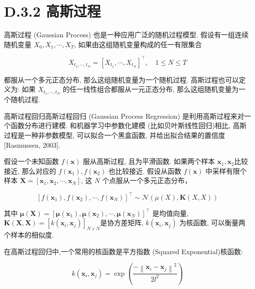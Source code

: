 \documentclass[10pt]{article}
\begin{document}
\section*{D.3.2 高斯过程}
高斯过程 (Gaussian Process) 也是一种应用广泛的随机过程模型. 假设有一组连续随机变量 $X_{0}, X_{1}, \cdots, X_{T}$, 如果由这组随机变量构成的任一有限集合

$$
X_{t_{1}, \cdots, t_{N}}=\left[X_{t_{1}}, \cdots, X_{t_{N}}\right]^{\top}, \quad 1 \leq N \leq T
$$

都服从一个多元正态分布, 那么这组随机变量为一个随机过程. 高斯过程也可以定义为: 如果 $X_{t_{1}, \cdots, t_{N}}$ 的任一线性组合都服从一元正态分布, 那么这组随机变量为一个随机过程.

高斯过程回归高斯过程回归 (Gaussian Process Regression) 是利用高斯过程来对一个函数分布进行建模. 和机器学习中参数化建模 (比如贝叶斯线性回归)相比, 高斯过程是一种非参数模型, 可以拟合一个黑盒函数, 并给出拟合结果的置信度 [Rasmussen, 2003].

假设一个未知函数 $f(\boldsymbol{x})$ 服从高斯过程, 且为平滑函数. 如果两个样本 $\boldsymbol{x}_{1}, \boldsymbol{x}_{2}$比较接近, 那么对应的 $f\left(\boldsymbol{x}_{1}\right), f\left(\boldsymbol{x}_{2}\right)$ 也比较接近. 假设从函数 $f(\boldsymbol{x})$ 中采样有限个样本 $\boldsymbol{X}=\left[\boldsymbol{x}_{1}, \boldsymbol{x}_{2}, \cdots, \boldsymbol{x}_{N}\right]$, 这 $N$ 个点服从一个多元正态分布，


\begin{equation*}
\left[f\left(\boldsymbol{x}_{1}\right), f\left(\boldsymbol{x}_{2}\right), \cdots, f\left(\boldsymbol{x}_{N}\right)\right]^{\top} \sim \mathcal{N}(\mu(X), \boldsymbol{K}(X, X)) \tag{D.50}
\end{equation*}


其中 $\boldsymbol{\mu}(\boldsymbol{X})=\left[\boldsymbol{\mu}\left(\boldsymbol{x}_{1}\right), \boldsymbol{\mu}\left(\boldsymbol{x}_{2}\right), \cdots, \boldsymbol{\mu}\left(\boldsymbol{x}_{N}\right)\right]^{\top}$ 是均值向量, $\boldsymbol{K}(\boldsymbol{X}, \boldsymbol{X})=\left[k\left(\boldsymbol{x}_{i}, \boldsymbol{x}_{j}\right)\right]_{N \times N}$是协方差矩阵, $k\left(\boldsymbol{x}_{i}, \boldsymbol{x}_{j}\right)$ 为核函数, 可以衡量两个样本的相似度.

在高斯过程回归中,一个常用的核函数是平方指数 (Squared Exponential)核函数:


\begin{equation*}
k\left(\boldsymbol{x}_{i}, \boldsymbol{x}_{j}\right)=\exp \left(\frac{-\left\|\boldsymbol{x}_{i}-\boldsymbol{x}_{j}\right\|^{2}}{2 l^{2}}\right) \tag{D.51}
\end{equation*}
\end{document}
